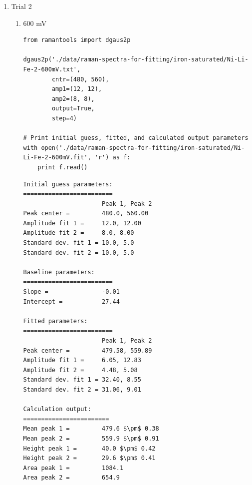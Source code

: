 \documentclass[journal=jpccck,manuscript=suppinfo,email=true]{achemso}
\begin{document}
\begin{enumerate}
\begin{enumerate}
\begin{enumerate}
\begin{verbatim}
Baseline parameters:
=========================
Slope =               -0.02
Intercept =           39.96

Fitted parameters:
=========================
                      Peak 1, Peak 2
Peak center =         480.09, 560.78
Amplitude fit 1 =     9.63, 24.51
Amplitude fit 2 =     10.20, 7.39
Standard dev. fit 1 = 37.88, 8.80
Standard dev. fit 2 = 29.65, 5.53

Calculation output:
========================
Mean peak 1 =         480.1 $\pm$ 0.25
Mean peak 2 =         560.8 $\pm$ 0.58
Height peak 1 =       62.6 $\pm$ 0.48
Height peak 2 =       44.1 $\pm$ 0.58
Area peak 1 =         2057.5
Area peak 2 =         1216.5
\end{verbatim}
\end{enumerate}

\item Trial 2
\label{sec-4-2-0-1-2}
\begin{enumerate}
\item 600 mV
\label{sec-4-2-0-1-2-1}
\begin{verbatim}
from ramantools import dgaus2p

dgaus2p('./data/raman-spectra-for-fitting/iron-saturated/Ni-Li-Fe-2-600mV.txt',
        cntr=(480, 560),
        amp1=(12, 12),
        amp2=(8, 8),
        output=True,
        step=4)

# Print initial guess, fitted, and calculated output parameters
with open('./data/raman-spectra-for-fitting/iron-saturated/Ni-Li-Fe-2-600mV.fit', 'r') as f:
    print f.read()
\end{verbatim}

\begin{verbatim}
Initial guess parameters:
=========================
                      Peak 1, Peak 2
Peak center =         480.0, 560.00
Amplitude fit 1 =     12.0, 12.00
Amplitude fit 2 =     8.0, 8.00
Standard dev. fit 1 = 10.0, 5.0
Standard dev. fit 2 = 10.0, 5.0

Baseline parameters:
=========================
Slope =               -0.01
Intercept =           27.44

Fitted parameters:
=========================
                      Peak 1, Peak 2
Peak center =         479.58, 559.89
Amplitude fit 1 =     6.05, 12.83
Amplitude fit 2 =     4.48, 5.08
Standard dev. fit 1 = 32.40, 8.55
Standard dev. fit 2 = 31.06, 9.01

Calculation output:
========================
Mean peak 1 =         479.6 $\pm$ 0.38
Mean peak 2 =         559.9 $\pm$ 0.91
Height peak 1 =       40.0 $\pm$ 0.42
Height peak 2 =       29.6 $\pm$ 0.41
Area peak 1 =         1084.1
Area peak 2 =         654.9
\end{verbatim}


\end{enumerate}
\end{enumerate}
\end{enumerate}
\end{document}
